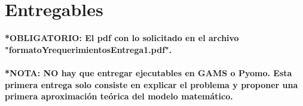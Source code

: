 \documentclass[runningheads]{llncs}
\begin{document}
\section{Entregables}
\textbf{*OBLIGATORIO: El pdf con lo solicitado en el archivo "formatoYrequerimientosEntrega1.pdf".}
\\ \\
\textbf{*NOTA: NO hay que entregar ejecutables en GAMS o Pyomo. Esta primera entrega solo consiste en explicar el problema y proponer una primera aproximaci\'{o}n te\'{o}rica del modelo matem\'{a}tico.}


%
%
%
% 
% 
%
\end{document}
